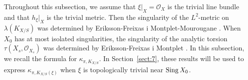 \documentclass[amscd, leqno]{amsart}
\theoremstyle{plain}
\theoremstyle{definition}
\theoremstyle{remark}
\begin{document}
Throughout this subsection, we assume that $\xi|_{X} = {\mathcal O}_{X}$ is the trivial line bundle and that $h_{\xi}|_{X}$ is the trivial metric.
Then the singularity of the $L^{2}$-metric on $\lambda(K_{X/S})$ was determined by 
Eriksson-Freixas i Montplet-Mourougane \cite[Prop.\,2.10]{EFM21}. 
When $X_{0}$ has at most isolated singularities, the singularity of the analytic torsion $\tau(X_{s}, {\mathcal O}_{X_{s}})$ was determined by 
Eriksson-Freixas i Montplet \cite[Cor.\,3.2]{ErikssonFreixas26}. 
In this subsection, we recall the formula for $\kappa_{\pi, K_{X/S}}$.
In Section~\ref{sect:7}, these results will be used to express $\kappa_{\pi, K_{X/S}(\xi)}$
when $\xi$ is topologically trivial near ${\rm Sing}\,X_{0}$.




\end{document}

